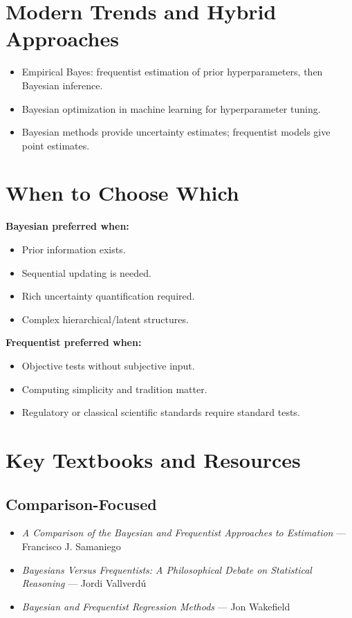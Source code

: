 \documentclass[12pt]{article}
\begin{document}
\section{Modern Trends and Hybrid Approaches}
\begin{itemize}
    \item Empirical Bayes: frequentist estimation of prior hyperparameters, then Bayesian inference.
    \item Bayesian optimization in machine learning for hyperparameter tuning.
    \item Bayesian methods provide uncertainty estimates; frequentist models give point estimates.
\end{itemize}

\section{When to Choose Which}

\textbf{Bayesian preferred when:}
\begin{itemize}
    \item Prior information exists.
    \item Sequential updating is needed.
    \item Rich uncertainty quantification required.
    \item Complex hierarchical/latent structures.
\end{itemize}

\textbf{Frequentist preferred when:}
\begin{itemize}
    \item Objective tests without subjective input.
    \item Computing simplicity and tradition matter.
    \item Regulatory or classical scientific standards require standard tests.
\end{itemize}

\section{Key Textbooks and Resources}

\subsection{Comparison-Focused}
\begin{itemize}
    \item \textit{A Comparison of the Bayesian and Frequentist Approaches to Estimation} --- Francisco J. Samaniego
    \item \textit{Bayesians Versus Frequentists: A Philosophical Debate on Statistical Reasoning} --- Jordi Vallverd\'u
    \item \textit{Bayesian and Frequentist Regression Methods} --- Jon Wakefield
\end{itemize}
\end{document}
